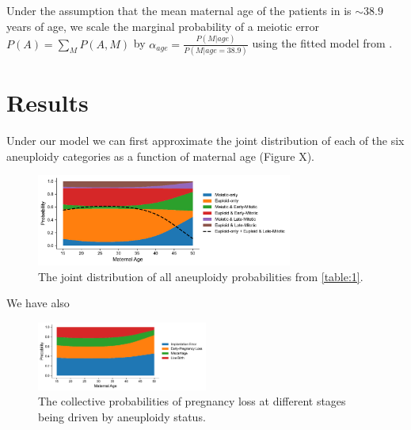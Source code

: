 \documentclass{article}
\begin{document}
Under the assumption that the mean maternal age of the patients in \citep{McCoy2023-dg} is $\sim 38.9$ years of age, we scale the marginal probability of a meiotic error $P(A) = \sum_M P(A,M)$ by $\alpha_{age} = \frac{P(M | age)}{P(M | age = 38.9)}$ using the fitted model from \citep{Gruhn2019-al}.

\section*{Results}

Under our model we can first approximate the joint distribution of each of the six aneuploidy categories as a function of maternal age (Figure X).

\begin{figure}[H]
\begin{center}
    \includegraphics[width=0.75\textwidth]{figures/joint_prob_aneuploidy.042024.pdf}
\end{center}
\vspace{-1.5em}
\caption{The joint distribution of all aneuploidy probabilities from \ref{table:1}.}
\label{fig:1}
\end{figure}

We have also 

\begin{figure}[H]
\begin{center}
    \includegraphics[width=0.5\textwidth]{figures/joint_prob_loss_category.042024.pdf}
\end{center}
\vspace{-1.5em}
\caption{The collective probabilities of pregnancy loss at different stages being driven by aneuploidy status.}
\label{fig:1}
\end{figure}




\end{document}
